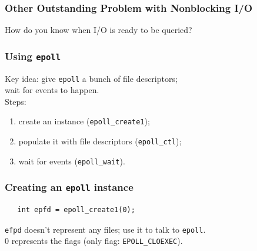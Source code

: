 \begin{frame}
  \frametitle{Other Outstanding Problem with Nonblocking I/O}

    How do you know when I/O is ready to be queried?


\end{frame}

\begin{frame}
  \frametitle{Using {\tt epoll}}
  
    Key idea: give {\tt epoll} a bunch of file descriptors;\\
     \hspace*{2em}wait for events to happen.\\[1em]

     Steps:
     \begin{enumerate}
       \item create an instance ({\tt epoll\_create1});
       \item populate it with file descriptors ({\tt epoll\_ctl});
       \item wait for events ({\tt epoll\_wait}).
     \end{enumerate}
  
\end{frame}

\begin{frame}[fragile]
  \frametitle{Creating an {\tt epoll} instance}
  
    \begin{minipage}{.5\textwidth}
    \begin{lstlisting}
   int epfd = epoll_create1(0);
    \end{lstlisting}
    \end{minipage}

    {\tt efpd} doesn't represent any files; use it to talk to {\tt epoll}.\\[1em]

    0 represents the flags (only flag: {\tt EPOLL\_CLOEXEC}).
    
  
\end{frame}

